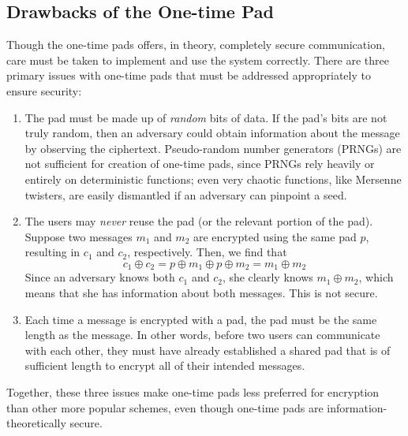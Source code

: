 \documentclass[twocolumn]{article}
\begin{document}
\subsection{Drawbacks of the One-time Pad}
Though the one-time pads offers, in theory, completely secure communication, care must be taken to implement and use the system correctly. There are three primary issues with one-time pads that must be addressed appropriately to ensure security:
\begin{enumerate}
\item The pad must be made up of \emph{random} bits of data. If the pad's bits are not truly random, then an adversary could obtain information about the message by observing the ciphertext. Pseudo-random number generators (PRNGs) are not sufficient for creation of one-time pads, since PRNGs rely heavily or entirely on deterministic functions; even very chaotic functions, like Mersenne twisters, are easily dismantled if an adversary can pinpoint a seed.
\item The users may \emph{never} reuse the pad (or the relevant portion of the pad). Suppose two messages $m_{1}$ and $m_{2}$ are encrypted using the same pad $p$, resulting in $c_1$ and $c_2$, respectively. Then, we find that
\[
c_{1} \oplus c_{2} = p \oplus m_{1} \oplus p \oplus m_{2}
= m_1 \oplus m_2
\]
Since an adversary knows both $c_1$ and $c_2$, she clearly knows $m_1 \oplus m_2$, which means that she has information about both messages. This is not secure.
\item Each time a message is encrypted with a pad, the pad must be the same length as the message. In other words, before two users can communicate with each other, they must have already established a shared pad that is of sufficient length to encrypt all of their intended messages.
\end{enumerate}
Together, these three issues make one-time pads less preferred for encryption than other more popular schemes, even though one-time pads are information-theoretically secure.
\end{document}
